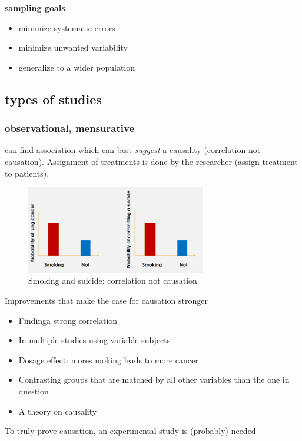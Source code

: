 \documentclass{article}
\begin{document}
\textbf{sampling goals}
\begin{itemize}
\item minimize systematic errors
\item minimize unwanted variability
\item generalize to a wider population
\end{itemize}

\subsection{types of studies}

\subsubsection{observational, mensurative}
can find association which can best \textit{suggest} a causality (correlation not causation). Assignment of treatments is done by the researcher (assign treatment to patients). 
\begin{figure}[h]
\center
\includegraphics[width = 0.7\textwidth]{exp-design/observational.png}
\caption{Smoking and suicide: correlation not causation}
\end{figure}
Improvements that make the case for causation stronger
\begin{itemize}
\item Findinga strong correlation
\item In multiple studies using variable subjects
\item Dosage effect: mores moking leads to more cancer
\item Contrasting groups that are matched by all other variables than the one in question
\item A theory on causality
\end{itemize}

To truly prove causation, an experimental study is (probably) needed
\end{document}
